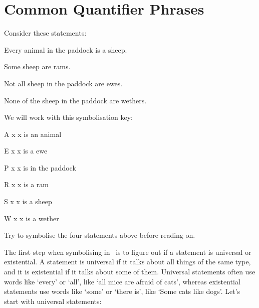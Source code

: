 \documentclass[PHIL101-Textbook.tex]{subfiles}
\begin{document}
\section{Common Quantifier Phrases}

\begin{center}
  \hspace{20pt}\href{https://youtu.be/p5HPtYRWyIc}
  {}
\end{center}\vspace{-12pt}

Consider these statements:
\begin{earg}
\item[\ex{quana}] Every animal in the paddock is a sheep.
\item[\ex{quanb}] Some sheep are rams.
\item[\ex{quanc}] Not all sheep in the paddock are ewes. 
\item[\ex{quand}] None of the sheep in the paddock are wethers. 
\end{earg}

\noindent We will work with this symbolisation key: 
\begin{ekey}
\item[\atom A x ] x is an animal
\item[\atom E x ] x is a ewe
\item[\atom P x ] x is in the paddock
\item[\atom R x ] x is a ram 
\item[\atom S x ] x is a sheep
\item[\atom W x ] x is a wether
\end{ekey}

\noindent Try to symbolise the four statements above before reading on.

The first step when symbolising in \pl\ is to figure out if a statement is universal or existential. A statement is universal if it talks about all things of the same type, and it is existential if it talks about some of them. Universal statements often use words like `every' or `all', like `all mice are afraid of cats', whereas existential statements use words like `some' or `there is', like `Some cats like dogs'. Let's start with universal statements: 
\end{document}

